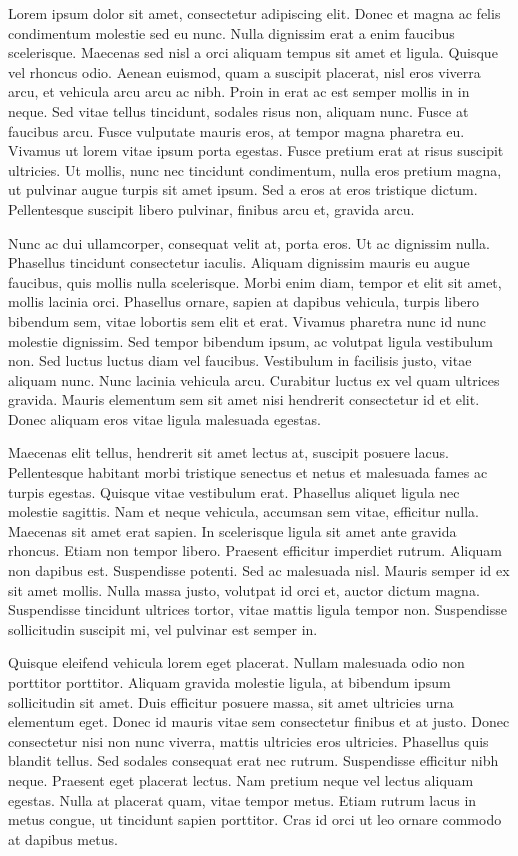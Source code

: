 \documentclass[sigconf]{acmart} %
\begin{document}
Lorem ipsum dolor sit amet, consectetur adipiscing elit. Donec et magna ac felis condimentum molestie sed eu nunc. Nulla dignissim erat a enim faucibus scelerisque. Maecenas sed nisl a orci aliquam tempus sit amet et ligula. Quisque vel rhoncus odio. Aenean euismod, quam a suscipit placerat, nisl eros viverra arcu, et vehicula arcu arcu ac nibh. Proin in erat ac est semper mollis in in neque. Sed vitae tellus tincidunt, sodales risus non, aliquam nunc. Fusce at faucibus arcu. Fusce vulputate mauris eros, at tempor magna pharetra eu. Vivamus ut lorem vitae ipsum porta egestas. Fusce pretium erat at risus suscipit ultricies. Ut mollis, nunc nec tincidunt condimentum, nulla eros pretium magna, ut pulvinar augue turpis sit amet ipsum. Sed a eros at eros tristique dictum. Pellentesque suscipit libero pulvinar, finibus arcu et, gravida arcu.

Nunc ac dui ullamcorper, consequat velit at, porta eros. Ut ac dignissim nulla. Phasellus tincidunt consectetur iaculis. Aliquam dignissim mauris eu augue faucibus, quis mollis nulla scelerisque. Morbi enim diam, tempor et elit sit amet, mollis lacinia orci. Phasellus ornare, sapien at dapibus vehicula, turpis libero bibendum sem, vitae lobortis sem elit et erat. Vivamus pharetra nunc id nunc molestie dignissim. Sed tempor bibendum ipsum, ac volutpat ligula vestibulum non. Sed luctus luctus diam vel faucibus. Vestibulum in facilisis justo, vitae aliquam nunc. Nunc lacinia vehicula arcu. Curabitur luctus ex vel quam ultrices gravida. Mauris elementum sem sit amet nisi hendrerit consectetur id et elit. Donec aliquam eros vitae ligula malesuada egestas.

Maecenas elit tellus, hendrerit sit amet lectus at, suscipit posuere lacus. Pellentesque habitant morbi tristique senectus et netus et malesuada fames ac turpis egestas. Quisque vitae vestibulum erat. Phasellus aliquet ligula nec molestie sagittis. Nam et neque vehicula, accumsan sem vitae, efficitur nulla. Maecenas sit amet erat sapien. In scelerisque ligula sit amet ante gravida rhoncus. Etiam non tempor libero. Praesent efficitur imperdiet rutrum. Aliquam non dapibus est. Suspendisse potenti. Sed ac malesuada nisl. Mauris semper id ex sit amet mollis. Nulla massa justo, volutpat id orci et, auctor dictum magna. Suspendisse tincidunt ultrices tortor, vitae mattis ligula tempor non. Suspendisse sollicitudin suscipit mi, vel pulvinar est semper in.

Quisque eleifend vehicula lorem eget placerat. Nullam malesuada odio non porttitor porttitor. Aliquam gravida molestie ligula, at bibendum ipsum sollicitudin sit amet. Duis efficitur posuere massa, sit amet ultricies urna elementum eget. Donec id mauris vitae sem consectetur finibus et at justo. Donec consectetur nisi non nunc viverra, mattis ultricies eros ultricies. Phasellus quis blandit tellus. Sed sodales consequat erat nec rutrum. Suspendisse efficitur nibh neque. Praesent eget placerat lectus. Nam pretium neque vel lectus aliquam egestas. Nulla at placerat quam, vitae tempor metus. Etiam rutrum lacus in metus congue, ut tincidunt sapien porttitor. Cras id orci ut leo ornare commodo at dapibus metus.
\end{document}
